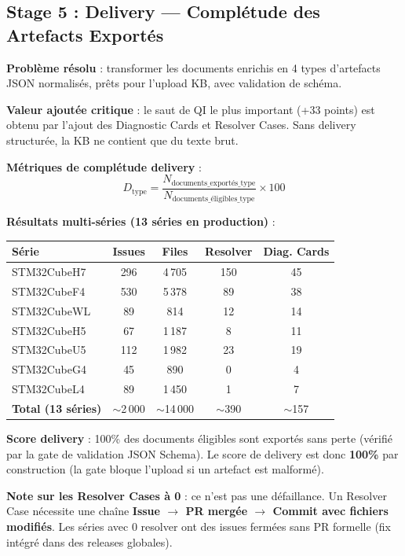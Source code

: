 \documentclass[12pt,a4paper]{report}
\begin{document}
\subsection{Stage 5 : Delivery --- Complétude des Artefacts Exportés}
\label{sec:eval_delivery}

\textbf{Problème résolu} : transformer les documents enrichis en 4 types d'artefacts JSON normalisés, prêts pour l'upload KB, avec validation de schéma.

\textbf{Valeur ajoutée critique} : le saut de QI le plus important (+33 points) est obtenu par l'ajout des Diagnostic Cards et Resolver Cases. Sans delivery structurée, la KB ne contient que du texte brut.

\textbf{Métriques de complétude delivery} :
\begin{equation}
D_{\text{type}} = \frac{N_{\text{documents\_exportés\_type}}}{N_{\text{documents\_éligibles\_type}}} \times 100
\end{equation}

\textbf{Résultats multi-séries (13 séries en production)} :

\begin{longtable}{lcccc}
\toprule
\textbf{Série} & \textbf{Issues} & \textbf{Files} & \textbf{Resolver} & \textbf{Diag. Cards} \\
\midrule
STM32CubeH7 & 296 & 4\,705 & 150 & 45 \\
STM32CubeF4 & 530 & 5\,378 & 89 & 38 \\
STM32CubeWL & 89 & 814 & 12 & 14 \\
STM32CubeH5 & 67 & 1\,187 & 8 & 11 \\
STM32CubeU5 & 112 & 1\,982 & 23 & 19 \\
STM32CubeG4 & 45 & 890 & 0 & 4 \\
STM32CubeL4 & 89 & 1\,450 & 1 & 7 \\
\midrule
\textbf{Total (13 séries)} & $\sim$2\,000 & $\sim$14\,000 & $\sim$390 & $\sim$157 \\
\bottomrule
\end{longtable}

\textbf{Score delivery} : 100\% des documents éligibles sont exportés sans perte (vérifié par la gate de validation JSON Schema). Le score de delivery est donc \textbf{100\%} par construction (la gate bloque l'upload si un artefact est malformé).

\textbf{Note sur les Resolver Cases à 0} : ce n'est pas une défaillance. Un Resolver Case nécessite une chaîne \textbf{Issue $\to$ PR mergée $\to$ Commit avec fichiers modifiés}. Les séries avec 0 resolver ont des issues fermées sans PR formelle (fix intégré dans des releases globales).
\end{document}
